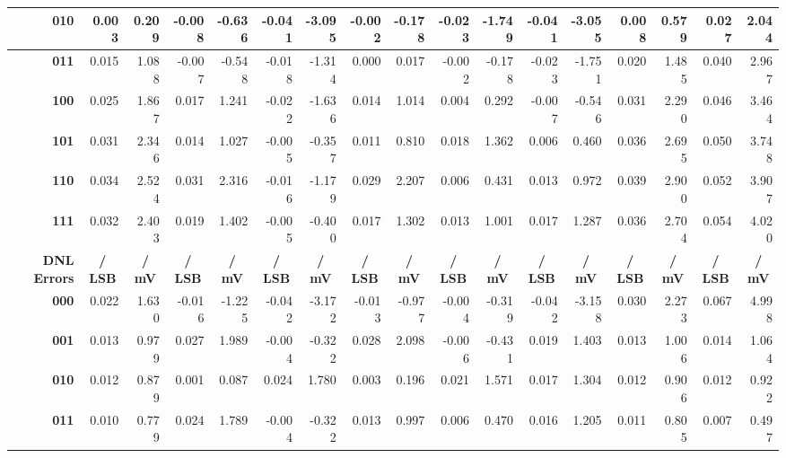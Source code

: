 \documentclass[parskip,oneside,colorbacktitle,10pt,accentcolor=tud1b,table]{tudreport}
\begin{document}
{\begin{table}
\begin{tabular}{|r|r|r|r|r|r|r|r|r|r|r|r|r|r|r|r|r|}
    \hline
    \textbf{010} & 0.003 & 0.209 & -0.008 & -0.636 & -0.041 & -3.095 & -0.002 & -0.178 & -0.023 & -1.749 & -0.041 & -3.055 & 0.008 & 0.579 & 0.027 & 2.044 \\
    \hline
    \textbf{011} & 0.015 & 1.088 & -0.007 & -0.548 & -0.018 & -1.314 & 0.000 & 0.017 & -0.002 & -0.178 & -0.023 & -1.751 & 0.020 & 1.485 & 0.040 & 2.967 \\
    \hline
    \textbf{100} & 0.025 & 1.867 & 0.017 & 1.241 & -0.022 & -1.636 & 0.014 & 1.014 & 0.004 & 0.292 & -0.007 & -0.546 & 0.031 & 2.290 & 0.046 & 3.464 \\
    \hline
    \textbf{101} & 0.031 & 2.346 & 0.014 & 1.027 & -0.005 & -0.357 & 0.011 & 0.810 & 0.018 & 1.362 & 0.006 & 0.460 & 0.036 & 2.695 & 0.050 & 3.748 \\
    \hline
    \textbf{110} & 0.034 & 2.524 & 0.031 & 2.316 & -0.016 & -1.179 & 0.029 & 2.207 & 0.006 & 0.431 & 0.013 & 0.972 & 0.039 & 2.900 & 0.052 & 3.907 \\
    \hline
    \textbf{111} & 0.032 & 2.403 & 0.019 & 1.402 & -0.005 & -0.400 & 0.017 & 1.302 & 0.013 & 1.001 & 0.017 & 1.287 & 0.036 & 2.704 & 0.054 & 4.020 \\
    \hline
    \multicolumn{1}{|r}{\textbf{DNL Errors}} & \multicolumn{1}{c}{\textbf{/ LSB}} & \multicolumn{1}{c}{\textbf{/ mV}} & \multicolumn{1}{c}{\textbf{/ LSB}} & \multicolumn{1}{c}{\textbf{/ mV}} & \multicolumn{1}{c}{\textbf{/ LSB}} & \multicolumn{1}{c}{\textbf{/ mV}} & \multicolumn{1}{c}{\textbf{/ LSB}} & \multicolumn{1}{c}{\textbf{/ mV}} & \multicolumn{1}{c}{\textbf{/ LSB}} & \multicolumn{1}{c}{\textbf{/ mV}} & \multicolumn{1}{c}{\textbf{/ LSB}} & \multicolumn{1}{c}{\textbf{/ mV}} & \multicolumn{1}{c}{\textbf{/ LSB}} & \multicolumn{1}{c}{\textbf{/ mV}} & \multicolumn{1}{c}{\textbf{/ LSB}} & \multicolumn{1}{c|}{\textbf{/ mV}} \\
    \hline
    \textbf{000} & 0.022 & 1.630 & -0.016 & -1.225 & -0.042 & -3.172 & -0.013 & -0.977 & -0.004 & -0.319 & -0.042 & -3.158 & 0.030 & 2.273 & 0.067 & 4.998 \\
    \hline
    \textbf{001} & 0.013 & 0.979 & 0.027 & 1.989 & -0.004 & -0.322 & 0.028 & 2.098 & -0.006 & -0.431 & 0.019 & 1.403 & 0.013 & 1.006 & 0.014 & 1.064 \\
    \hline
    \textbf{010} & 0.012 & 0.879 & 0.001 & 0.087 & 0.024 & 1.780 & 0.003 & 0.196 & 0.021 & 1.571 & 0.017 & 1.304 & 0.012 & 0.906 & 0.012 & 0.922 \\
    \hline
    \textbf{011} & \multicolumn{1}{r}{0.010} & 0.779 & 0.024 & 1.789 & -0.004 & -0.322 & 0.013 & 0.997 & 0.006 & 0.470 & 0.016 & 1.205 & 0.011 & 0.805 & 0.007 & 0.497 \\

\end{tabular}
\end{table}}
\end{document}
